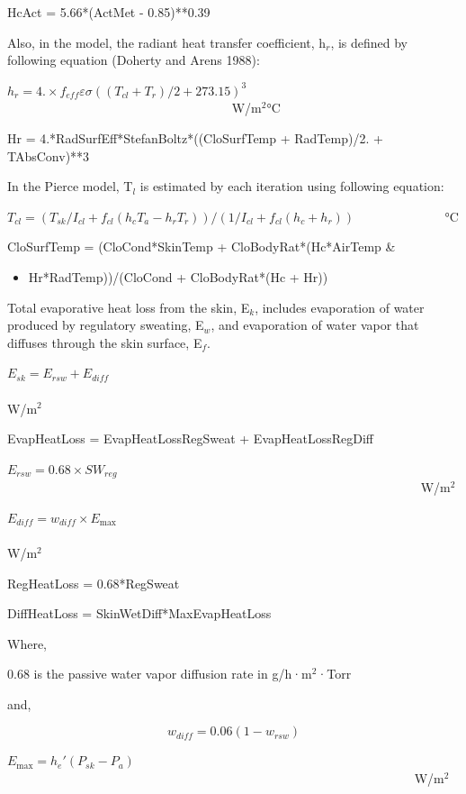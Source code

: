 HcAct = 5.66*(ActMet - 0.85)**0.39

Also, in the model, the radiant heat transfer coefficient, h\(_{r}\), is defined by following equation (Doherty and Arens 1988):

\({h_r} = 4. \times {f_{eff}}\varepsilon \sigma {(({T_{cl}} + {T_r})/2 + 273.15)^3}\) ~~~~~~~~~~~~~~~~~~~~~~~~~~~~~~~~~~~ W/m\(^{2}\)°C

Hr = 4.*RadSurfEff*StefanBoltz*((CloSurfTemp + RadTemp)/2. + TAbsConv)**3

In the Pierce model, T\(_{l}\) is estimated by each iteration using following equation:

\({T_{cl}} = ({T_{sk}}/{I_{cl}} + {f_{cl}}({h_c}{T_a} - {h_r}{T_r}))/(1/{I_{cl}} + {f_{cl}}({h_c} + {h_r}))\) ~~~~~~~~~~~~~ °C

CloSurfTemp = (CloCond*SkinTemp + CloBodyRat*(Hc*AirTemp \&

\begin{itemize}
\tightlist
\item
  Hr*RadTemp))/(CloCond + CloBodyRat*(Hc + Hr))
\end{itemize}

Total evaporative heat loss from the skin, E\(_{k}\), includes evaporation of water produced by regulatory sweating, E\(_{w}\), and evaporation of water vapor that diffuses through the skin surface, E\(_{f}\).

\({E_{sk}} = {E_{rsw}} + {E_{diff}}\) ~~~~~~~~~~~~~~~~~~~~~~~~~~~~~~~~~~~~~~~~~~~~~~~~~~~~~~~~~~~~~~~~~~~~~ W/m\(^{2}\)

EvapHeatLoss = EvapHeatLossRegSweat + EvapHeatLossRegDiff

\({E_{rsw}} = 0.68 \times S{W_{reg}}\) ~~~~~~~~~~~~~~~~~~~~~~~~~~~~~~~~~~~~~~~~~~~~~~~~~~~~~~~~~~~~~~~~~ W/m\(^{2}\)

\({E_{diff}} = {w_{diff}} \times {E_{\max }}\) ~~~~~~~~~~~~~~~~~~~~~~~~~~~~~~~~~~~~~~~~~~~~~~~~~~~~~~~~~~~~~~~~~~~ W/m\(^{2}\)

RegHeatLoss = 0.68*RegSweat

DiffHeatLoss = SkinWetDiff*MaxEvapHeatLoss

Where,

0.68 is the passive water vapor diffusion rate in g/h·m\(^{2}\)·Torr

and,

\begin{equation}
{w_{diff}} = 0.06(1 - {w_{rsw}})
\end{equation}

\({E_{\max }} = {h_e}'({P_{sk}} - {P_a})\) ~~~~~~~~~~~~~~~~~~~~~~~~~~~~~~~~~~~~~~~~~~~~~~~~~~~~~~~~~~~~~~~~ W/m\(^{2}\)

